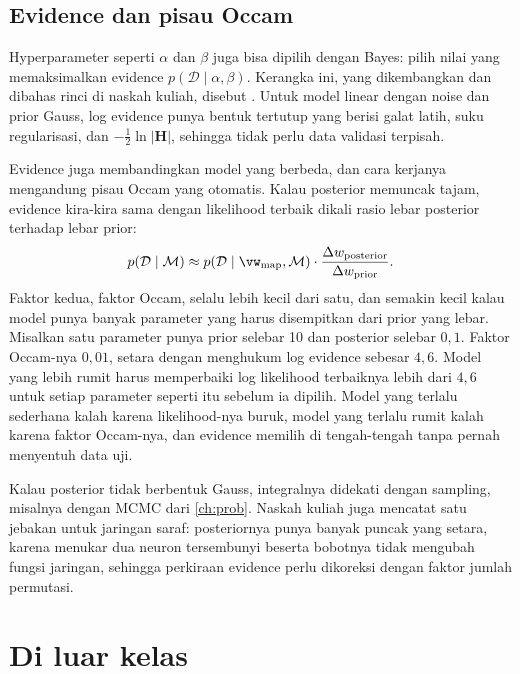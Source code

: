 \subsection{Evidence dan pisau Occam}

Hyperparameter seperti $\alpha$ dan $\beta$ juga bisa dipilih dengan Bayes: pilih nilai yang memaksimalkan evidence
$p(\mathcal D\mid\alpha,\beta)$. Kerangka ini, yang dikembangkan \citet{mackay1992} dan dibahas rinci di naskah kuliah, disebut
. Untuk model linear dengan noise dan prior Gauss, log evidence punya bentuk tertutup yang berisi
galat latih, suku regularisasi, dan $-\tfrac12\ln|\bm H|$, sehingga tidak perlu data validasi terpisah.

Evidence juga membandingkan model yang berbeda, dan cara kerjanya mengandung pisau Occam yang otomatis. Kalau posterior
memuncak tajam, evidence kira-kira sama dengan likelihood terbaik dikali rasio lebar posterior terhadap lebar prior:
\begin{equation}
p(\mathcal D\mid\mathcal M)\approx p(\mathcal D\mid\vw_{\mathrm{map}},\mathcal M)\cdot\frac{\Delta w_{\mathrm{posterior}}}{\Delta w_{\mathrm{prior}}}.
\end{equation}
Faktor kedua, faktor Occam, selalu lebih kecil dari satu, dan semakin kecil kalau model punya banyak parameter yang harus
disempitkan dari prior yang lebar. Misalkan satu parameter punya prior selebar 10 dan posterior selebar $0{,}1$. Faktor
Occam-nya $0{,}01$, setara dengan menghukum log evidence sebesar $4{,}6$. Model yang lebih rumit harus memperbaiki log
likelihood terbaiknya lebih dari $4{,}6$ untuk setiap parameter seperti itu sebelum ia dipilih. Model yang terlalu sederhana
kalah karena likelihood-nya buruk, model yang terlalu rumit kalah karena faktor Occam-nya, dan evidence memilih di
tengah-tengah tanpa pernah menyentuh data uji.

Kalau posterior tidak berbentuk Gauss, integralnya didekati dengan sampling, misalnya dengan MCMC dari \cref{ch:prob}. Naskah
kuliah juga mencatat satu jebakan untuk jaringan saraf: posteriornya punya banyak puncak yang setara, karena menukar dua
neuron tersembunyi beserta bobotnya tidak mengubah fungsi jaringan, sehingga perkiraan evidence perlu dikoreksi dengan
faktor jumlah permutasi.

\section{Di luar kelas}

